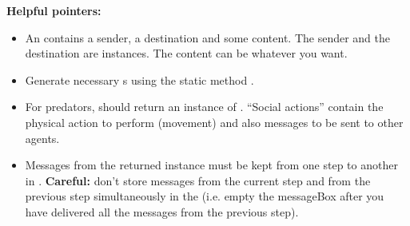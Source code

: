 \documentclass[a4paper, 12pt, twoside]{article}
\begin{document}
\textbf{Helpful pointers:} \begin{itemize}\itemsep1.5ex
	\item An  contains a sender, a destination and some content. The sender and the destination are  instances. The content can be whatever you want.
	\item Generate necessary s using the static method .
	\item For predators,  should return an instance of . ``Social actions'' contain the physical action to perform (movement) and also messages to be sent to other agents.
	\item Messages from the returned  instance must be kept from one step to another in . \textbf{Careful:} don't store messages from the current step and from the previous step simultaneously in the  (i.e. empty the messageBox after you have delivered all the messages from the previous step). 
\end{itemize}


\end{document}
